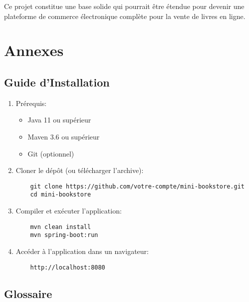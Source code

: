 \documentclass[12pt,a4paper]{report}
\begin{document}
Ce projet constitue une base solide qui pourrait être étendue pour devenir une plateforme de commerce électronique complète pour la vente de livres en ligne.

\chapter{Annexes}

\section{Guide d'Installation}

\begin{enumerate}
    \item Prérequis:
    \begin{itemize}
        \item Java 11 ou supérieur
        \item Maven 3.6 ou supérieur
        \item Git (optionnel)
    \end{itemize}
    
    \item Cloner le dépôt (ou télécharger l'archive):
    \begin{verbatim}
    git clone https://github.com/votre-compte/mini-bookstore.git
    cd mini-bookstore
    \end{verbatim}
    
    \item Compiler et exécuter l'application:
    \begin{verbatim}
    mvn clean install
    mvn spring-boot:run
    \end{verbatim}
    
    \item Accéder à l'application dans un navigateur:
    \begin{verbatim}
    http://localhost:8080
    \end{verbatim}
\end{enumerate}

\section{Glossaire}
\end{document}
